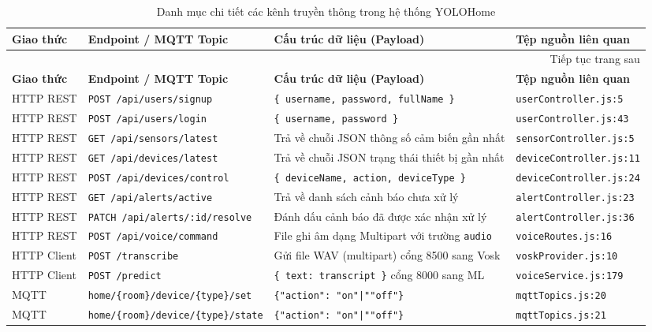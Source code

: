 \begin{longtable}{p{2.5cm} p{5.5cm} p{4.5cm} p{3.0cm}}
\caption{Danh mục chi tiết các kênh truyền thông trong hệ thống YOLOHome}
\label{tab:rest-api} \\
\toprule
\textbf{Giao thức} & \textbf{Endpoint / MQTT Topic} & \textbf{Cấu trúc dữ liệu (Payload)} & \textbf{Tệp nguồn liên quan} \\
\midrule
\endfirsthead
\multicolumn{4}{r}{Tiếp tục trang sau} \\
\toprule
\textbf{Giao thức} & \textbf{Endpoint / MQTT Topic} & \textbf{Cấu trúc dữ liệu (Payload)} & \textbf{Tệp nguồn liên quan} \\
\midrule
\endhead
\bottomrule
\endfoot
\bottomrule
\endlastfoot
HTTP REST & \texttt{POST /api/users/signup} & \texttt{\{ username, password, fullName \}} & \texttt{userController.js:5} \\
HTTP REST & \texttt{POST /api/users/login} & \texttt{\{ username, password \}} & \texttt{userController.js:43} \\
HTTP REST & \texttt{GET /api/sensors/latest} & Trả về chuỗi JSON thông số cảm biến gần nhất & \texttt{sensorController.js:5} \\
HTTP REST & \texttt{GET /api/devices/latest} & Trả về chuỗi JSON trạng thái thiết bị gần nhất & \texttt{deviceController.js:11} \\
HTTP REST & \texttt{POST /api/devices/control} & \texttt{\{ deviceName, action, deviceType \}} & \texttt{deviceController.js:24} \\
HTTP REST & \texttt{GET /api/alerts/active} & Trả về danh sách cảnh báo chưa xử lý & \texttt{alertController.js:23} \\
HTTP REST & \texttt{PATCH /api/alerts/:id/resolve} & Đánh dấu cảnh báo đã được xác nhận xử lý & \texttt{alertController.js:36} \\
HTTP REST & \texttt{POST /api/voice/command} & File ghi âm dạng Multipart với trường \texttt{audio} & \texttt{voiceRoutes.js:16} \\
HTTP Client & \texttt{POST /transcribe} & Gửi file WAV (multipart) cổng 8500 sang Vosk & \texttt{voskProvider.js:10} \\
HTTP Client & \texttt{POST /predict} & \texttt{\{ text: transcript \}} cổng 8000 sang ML & \texttt{voiceService.js:179} \\
\midrule
MQTT & \texttt{home/\{room\}/device/\{type\}/set} & \texttt{\{"action": "on"|""off"\}} & \texttt{mqttTopics.js:20} \\
MQTT & \texttt{home/\{room\}/device/\{type\}/state} & \texttt{\{"action": "on"|""off"\}} & \texttt{mqttTopics.js:21} \\

\end{longtable}
